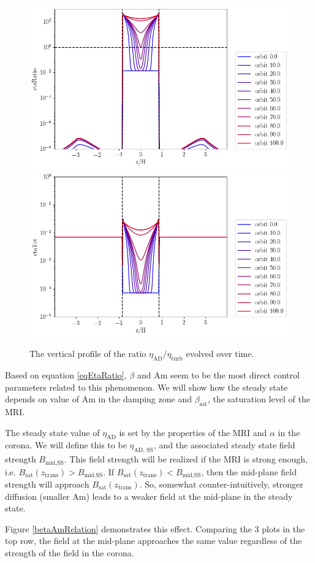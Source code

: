 \begin{figure}[p]
\centering
\includegraphics[width=0.49\columnwidth]{figs/figsChapter5/fiducialForPaper/withAD/etaRatio.png}
\includegraphics[width=0.49\columnwidth]{figs/figsChapter5/fiducialForPaper/withAD/etaTot.png}
\caption{The vertical profile of the ratio $\eta_\text{AD}/\eta_\text{turb}$ evolved over time.}
\label{etaRatio}
\end{figure}

Based on equation \ref{eqEtaRatio}, $\beta$ and Am seem to be the most direct control parameters related to this phenomenon.  We will show how the steady state depends on value of Am in the damping zone and $\beta_{\text{sat}}$, the saturation level of the MRI.

The steady state value of $\eta_{\text{AD}}$ is set by the properties of the MRI and $\alpha$ in the corona.  We will define this to be $\eta_{\text{AD, SS}}$, and the associated steady state field strength $B_{\text{mid,SS}}$.  This field strength will be realized if the MRI is strong enough, i.e. $B_{\text{sat}}(z_\text{trans}) > B_{\text{mid,SS}}$.  If $B_{\text{sat}}(z_\text{trans}) < B_{\text{mid,SS}}$, then the mid-plane field strength will approach $B_{\text{sat}}(z_\text{trans})$.  So, somewhat counter-intuitively, stronger diffusion (smaller Am) leads to a weaker field at the mid-plane in the steady state.  

Figure \ref{betaAmRelation} demonstrates this effect.  Comparing the 3 plots in the top row, the field at the mid-plane approaches the same value regardless of the strength of the field in the corona.  

